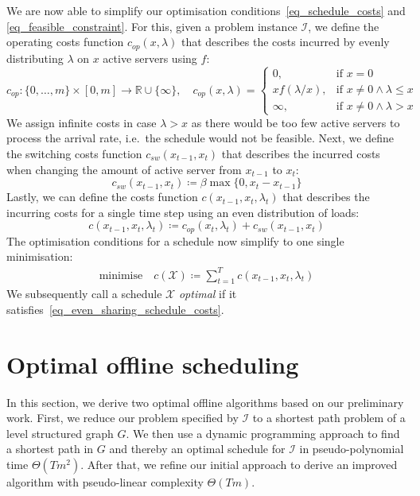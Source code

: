 \documentclass[hidelinks]{article}
\theoremstyle{plain}
\theoremstyle{definition}
\theoremstyle{rem}
\newcommand{\mx}{\mathcal{X}}
\newcommand{\inp}{\mathcal{I}}
\newcommand{\costs}{c}
\newcommand{\opcosts}{c_{op}}
\newcommand{\swcosts}{c_{sw}}
\newcommand{\fromto}[2]{\{#1,\ldots,#2\}}
\begin{document}
We are now able to simplify our optimisation conditions~\eqref{eq_schedule_costs} and \eqref{eq_feasible_constraint}. 
For this, given a problem instance $\inp$, we define the operating costs function $\opcosts(x,\lambda)$ that describes the costs incurred by evenly distributing $\lambda$ on $x$ active servers using $f$:
\begin{equation*}
	\opcosts:\fromto{0}{m}\times[0,m]\rightarrow\mathbb{R}\cup\{\infty\},\quad \opcosts(x,\lambda)=\begin{cases}
          0, & \text{if $x=0$}\\
	  x f(\lambda/x), & \text{if $x\ne 0\land\lambda\le x$}\\
	  \infty, & \text{if $x\ne 0\land\lambda>x$}
	  \end{cases} \label{fct:c}
\end{equation*}
We assign infinite costs in case $\lambda>x$ as there would be too few active servers to process the arrival rate, i.e.\ the schedule would not be feasible. Next, we define the switching costs function $\swcosts(x_{t-1},x_t)$ that describes the incurred costs when changing the amount of active server from $x_{t-1}$ to $x_t$:
\begin{equation*}
	\swcosts(x_{t-1},x_t)\coloneqq\beta\max\{0,x_t-x_{t-1}\}
\end{equation*}
Lastly, we can define the costs function $\costs(x_{t-1},x_t,\lambda_t)$ that describes the incurring costs for a single time step using an even distribution of loads:
\begin{equation*}
	\costs(x_{t-1},x_{t},\lambda_t)\coloneqq\opcosts(x_t,\lambda_t)+\swcosts(x_{t-1},x_t)
\end{equation*}
The optimisation conditions for a schedule now simplify to one single minimisation:
\begin{align}
	\text{minimise}\quad \costs(\mx)\coloneqq\sum\limits_{t=1}^{T}\costs(x_{t-1},x_{t},\lambda_t)\label{eq_even_sharing_schedule_costs}
\end{align}
We subsequently call a schedule $\mx$ \textit{optimal} if it satisfies~\eqref{eq_even_sharing_schedule_costs}.

\section{Optimal offline scheduling}
In this section, we derive two optimal offline algorithms based on our preliminary work.
First, we reduce our problem specified by $\inp$ to a shortest path problem of a level structured graph $G$. We then use a dynamic programming approach to find a shortest path in $G$ and thereby an optimal schedule for $\inp$ in pseudo-polynomial time $\Theta(Tm^2)$.
After that, we refine our initial approach to derive an improved algorithm with pseudo-linear complexity $\Theta(Tm)$.
\end{document}
